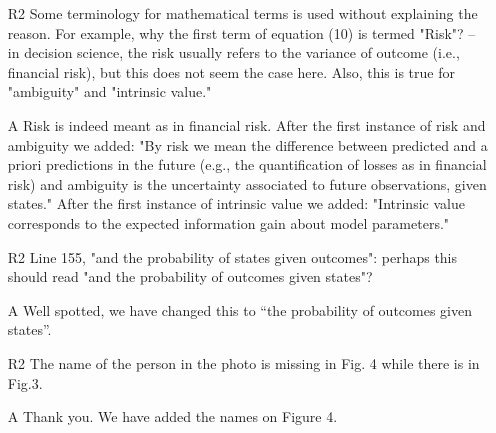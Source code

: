 \documentclass{article}
\begin{document}
\begin{itemize}
\item[R2] Some terminology for mathematical terms is used without explaining the reason. For example, why the first term of equation (10) is termed "Risk"? -- in decision science, the risk usually refers to the variance of outcome (i.e., financial risk), but this does not seem the case here. Also, this is true for "ambiguity" and "intrinsic value."
\item[A] Risk is indeed meant as in financial risk. After the first instance of risk and ambiguity we added: "By risk we mean the difference between predicted and a priori predictions in the future (e.g., the quantification of losses as in financial risk) and ambiguity is the uncertainty associated to future observations, given states." After the first instance of intrinsic value we added: "Intrinsic value corresponds to the expected information gain about model parameters."
\item[R2] Line 155, "and the probability of states given outcomes": perhaps this should read "and the probability of outcomes given states"?
\item[A] Well spotted, we have changed this to “the probability of outcomes given states”.
\item[R2] The name of the person in the photo is missing in Fig. 4 while there is in Fig.3.
\item[A] Thank you. We have added the names on Figure 4.
\end{itemize}
\end{document}
